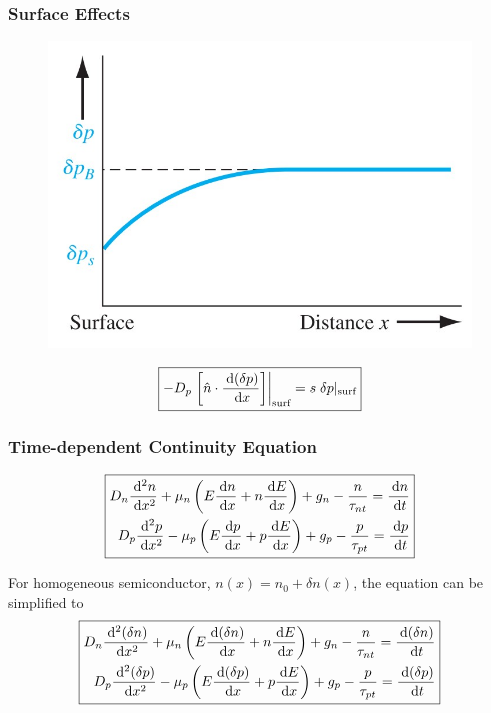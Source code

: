 \documentclass{beamer}
\begin{document}
    \begin{frame} \frametitle{Surface Effects}
        \begin{figure}[H]
            \centering
            \includegraphics[width=0.6\linewidth]{Suerface-concentration.jpg}
            \label{fig:Suerface-concentration.jpg}
        \end{figure}
        
        \begin{equation*}
            \begin{aligned}
                \boxed{- D_p \left. \left[ \hat{n} \cdot \frac{\: \mathrm{d} (\delta p)}{\: \mathrm{d} x}  \right] \right|_{\text{surf}} = s \; \delta p |_{\text{surf}}}
            \end{aligned}
        \end{equation*}
    \end{frame}

    \begin{frame} \frametitle{Time-dependent Continuity Equation}
        \begin{equation*}
            \boxed{
                \begin{aligned}
                    D_n \frac{\: \mathrm{d}^2 n}{\: \mathrm{d} x^2} + \mu_n \left( E \frac{\: \mathrm{d} n}{\: \mathrm{d} x} + n \frac{\: \mathrm{d} E}{\: \mathrm{d} x}  \right) + g_n - \frac{n}{\tau_{nt}} = \frac{\: \mathrm{d} n}{\: \mathrm{d} t} \\
                    D_p \frac{\: \mathrm{d}^2 p}{\: \mathrm{d} x^2} - \mu_p \left( E \frac{\: \mathrm{d} p}{\: \mathrm{d} x} + p \frac{\: \mathrm{d} E}{\: \mathrm{d} x}  \right) + g_p - \frac{p}{\tau_{pt}} = \frac{\: \mathrm{d} p}{\: \mathrm{d} t} \\
                \end{aligned}
            }
        \end{equation*}
        \par For homogeneous semiconductor, $n(x) = n_0 + \delta n(x)$, the equation can be simplified to 
        \begin{equation*}
            \boxed{
                \begin{aligned}
                    D_n \frac{\: \mathrm{d}^2 (\delta n)}{\: \mathrm{d} x^2} + \mu_n \left( E \frac{\: \mathrm{d} (\delta n)}{\: \mathrm{d} x} + n \frac{\: \mathrm{d} E}{\: \mathrm{d} x}  \right) + g_n - \frac{n}{\tau_{nt}} = \frac{\: \mathrm{d} (\delta n)}{\: \mathrm{d} t} \\
                    D_p \frac{\: \mathrm{d}^2 (\delta p)}{\: \mathrm{d} x^2} - \mu_p \left( E \frac{\: \mathrm{d} (\delta p)}{\: \mathrm{d} x} + p \frac{\: \mathrm{d} E}{\: \mathrm{d} x}  \right) + g_p - \frac{p}{\tau_{pt}} = \frac{\: \mathrm{d} (\delta p)}{\: \mathrm{d} t} \\
                \end{aligned}
            }
        \end{equation*}
    \end{frame}
\end{document}
